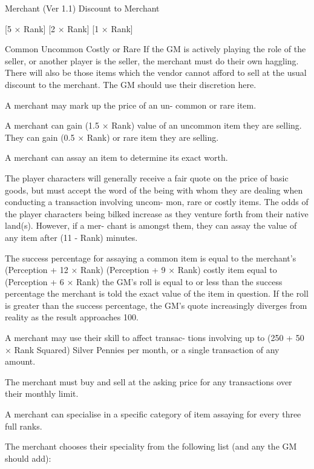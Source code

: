 \begin{Chapter}{Merchant (Ver 1.1)}
Discount to Merchant  

[5 × Rank] %
[2 × Rank] %
[1 × Rank] %

Common 
Uncommon 
Costly or Rare 
If the GM is actively playing the role of the seller, 
or  another  player  is  the  seller,  the  merchant  must 
do  their  own  haggling.  There  will  also  be  those 
items which the vendor cannot afford to sell at the 
usual discount to the merchant. The GM should use 
their discretion here. 

A  merchant  may  mark  up  the  price  of  an  un-
common or rare item. 

A  merchant  can  gain  (1.5  ×  Rank)%
value of an uncommon item they are selling. They 
can gain (0.5 × Rank)%
or rare item they are selling. 

A  merchant  can  assay  an  item  to  determine  its 
exact worth. 

The  player  characters  will  generally  receive  a  fair 
quote on the price of basic goods, but must accept 
the word of the being with whom they are dealing 
when  conducting  a  transaction  involving  uncom-
mon,  rare  or  costly  items.  The  odds  of  the  player 
characters  being  bilked  increase  as  they  venture 
forth from their native land(s). However, if a mer-
chant is amongst them, they can assay the value of 
any item after (11 - Rank) minutes. 

The  success  percentage  for  assaying  a  common 
item is equal to the merchant’s (Perception + 12 × 
Rank)%
(Perception  +  9  ×  Rank)%
costly  item  equal  to  (Perception  + 6  ×  Rank)%
the  GM’s  roll  is  equal  to  or  less  than  the  success 
percentage  the  merchant  is  told  the  exact  value  of 
the  item  in  question.  If  the  roll  is  greater  than  the 
success  percentage,  the  GM’s  quote  increasingly 
diverges from reality as the result approaches 100. 

A  merchant  may  use  their  skill  to  affect  transac-
tions  involving  up  to  (250  +  50  ×  Rank  Squared) 
Silver Pennies per month, or a single transaction of 
any amount. 

The merchant must buy and sell at the asking price 
for any transactions over their monthly limit. 

A merchant can specialise in a specific category 
of item assaying for every three full ranks. 

The  merchant  chooses  their  speciality  from  the 
following list (and any the GM should add): 


\end{Chapter}
